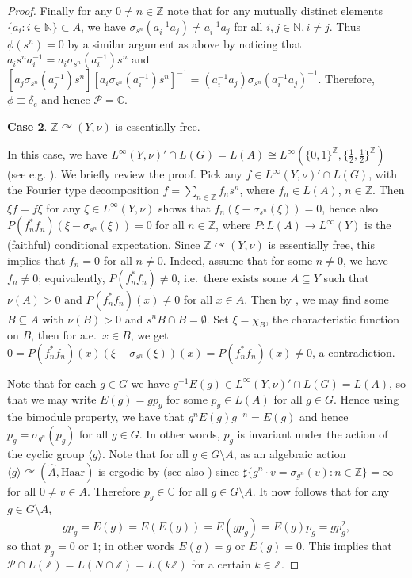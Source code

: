 \documentclass[11pt]{amsart}
\newcommand{\N}{\mathbb N}
\newcommand{\Z}{\mathbb Z}
\theoremstyle{plain}
\theoremstyle{definition}
\theoremstyle{remark}
\numberwithin{equation}{section}
\begin{document}
\begin{proof}
Finally for any $0\neq n\in\mathbb{Z}$ note that for any mutually distinct elements $\{a_i: i\in \N\}\subset A$, we have $\sigma_{s^n}(a_i^{-1}a_j)\neq a_i^{-1}a_j$ for all $i, j \in \N, i\neq j$. Thus $\phi(s^n)=0$ by a similar argument as above by noticing that $a_is^na_i^{-1}=a_i\sigma_{s^n}(a_i^{-1})s^n$ and $[a_j\sigma_{s^n}(a_j^{-1})s^n][a_i\sigma_{s^n}(a_i^{-1})s^n]^{-1}=(a_i^{-1}a_j)\sigma_{s^n}(a_i^{-1}a_j)^{-1}$. Therefore, $\phi\equiv \delta_e$ and hence $\mathcal{P}=\mathbb{C}$. 


\smallskip \textbf{Case 2}. $\mathbb{Z}\curvearrowright (Y,\nu)$ is essentially free.

\smallskip
In this case, we have $L^{\infty}(Y,\nu)'\cap L(G)=L(A)\cong L^{\infty}(\{0,1\}^{\mathbb{Z}}, \{\frac{1}{2},\frac{1}{2}\}^{\mathbb{Z}})$ (see e.g. \cite[Lemma 1.6]{packer}). We briefly review the proof. Pick any $f \in L^{\infty}(Y,\nu)'\cap L(G)$, with the Fourier type decomposition $f=\sum_{n\in\mathbb{Z}}f_ns^n$, where $f_n\in L(A)$, $n \in \Z$. Then $\xi f=f\xi$ for any $\xi\in L^{\infty}(Y,\nu)$ shows that $f_n(\xi-\sigma_{s^n}(\xi))=0$, hence also $P(f_n^*f_n)(\xi-\sigma_{s^n}(\xi))=0$ for all $n\in\mathbb{Z}$, where $P: L(A)\rightarrow L^{\infty}(Y)$ is the (faithful) conditional expectation. Since $\mathbb{Z}\curvearrowright (Y,\nu)$ is essentially free, this implies that $f_n=0$ for all $n\neq 0$. Indeed, assume that for some $n\neq 0$, we have $f_n\neq 0$; equivalently, $P(f_n^*f_n)\neq 0$, i.e.\ there exists some $A\subseteq Y$ such that $\nu(A)>0$ and $P(f_n^*f_n)(x)\neq 0$ for all $x\in A$. Then by \cite[Proposition 2.4]{kerrli_book}, we may find some $B\subseteq A$ with $\nu(B)>0$ and $s^nB\cap B=\emptyset$. Set $\xi=\chi_B$, the characteristic function on $B$, then for a.e.\ $x\in B$, we get $0=P(f_n^*f_n)(x)(\xi-\sigma_{s^n}(\xi))(x)=P(f_n^*f_n)(x)\neq 0$, a contradiction.

Note that for each $g \in G$ we have $g^{-1}E(g)\in L^{\infty}(Y,\nu)'\cap L(G)=L(A)$, so that we may write $E(g)=gp_g$ for some $p_g\in L(A)$  for all $g\in G$. Hence using the bimodule property, we have that $g^nE(g)g^{-n}=E(g)$ and hence $p_g=\sigma_{g^n}(p_g)$ for all $g\in G$. In other words, $p_g$ is invariant under the action of the cyclic group $\langle g\rangle$. Note that for all $g\in G\setminus A$, as an algebraic action $\langle g \rangle\curvearrowright (\widehat{A},\text{Haar})$ is ergodic by \cite[Lemma 1.2 and Theorem 1.6]{schmidt_book} (see also \cite[Theorem 3.1]{lps}) since $\sharp\{g^n\cdot v=\sigma_{g^n}(v): n\in\mathbb{Z}\}=\infty$ for all $0\neq v\in A$. 
Therefore $p_g\in\mathbb{C}$ for all $g\in G\setminus A$.  It now follows that for any $g\in G\setminus A$, $$gp_g=E(g)=E(E(g))=E(gp_g)=E(g)p_g=gp_g^2,$$ so that $p_g=0$ or $1$; in other words $E(g) = g$ or $E(g) =0$. %
This implies that $\mathcal{P}\cap L(\mathbb{Z})=L(N\cap \mathbb{Z})=L(k\mathbb{Z})$ for a certain $k \in \Z$. %


\end{proof}
\end{document}

